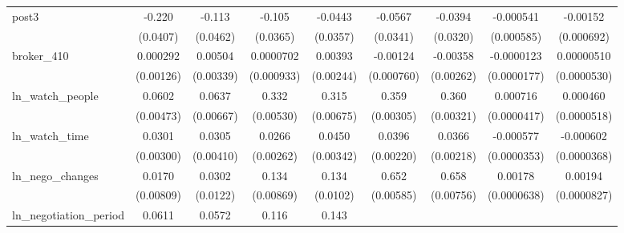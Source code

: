 {\begin{tabular}{l*{8}{c}}
\addlinespace
post3       &      -0.220\sym{***}&      -0.113\sym{**} &      -0.105\sym{***}&     -0.0443         &     -0.0567\sym{*}  &     -0.0394         &   -0.000541         &    -0.00152\sym{**} \\
            &    (0.0407)         &    (0.0462)         &    (0.0365)         &    (0.0357)         &    (0.0341)         &    (0.0320)         &  (0.000585)         &  (0.000692)         \\
\addlinespace
broker\_410  &    0.000292         &     0.00504         &   0.0000702         &     0.00393         &    -0.00124         &    -0.00358         &  -0.0000123         &  0.00000510         \\
            &   (0.00126)         &   (0.00339)         &  (0.000933)         &   (0.00244)         &  (0.000760)         &   (0.00262)         & (0.0000177)         & (0.0000530)         \\
\addlinespace
ln\_watch\_people&      0.0602\sym{***}&      0.0637\sym{***}&       0.332\sym{***}&       0.315\sym{***}&       0.359\sym{***}&       0.360\sym{***}&    0.000716\sym{***}&    0.000460\sym{***}\\
            &   (0.00473)         &   (0.00667)         &   (0.00530)         &   (0.00675)         &   (0.00305)         &   (0.00321)         & (0.0000417)         & (0.0000518)         \\
\addlinespace
ln\_watch\_time&      0.0301\sym{***}&      0.0305\sym{***}&      0.0266\sym{***}&      0.0450\sym{***}&      0.0396\sym{***}&      0.0366\sym{***}&   -0.000577\sym{***}&   -0.000602\sym{***}\\
            &   (0.00300)         &   (0.00410)         &   (0.00262)         &   (0.00342)         &   (0.00220)         &   (0.00218)         & (0.0000353)         & (0.0000368)         \\
\addlinespace
ln\_nego\_changes&      0.0170\sym{**} &      0.0302\sym{**} &       0.134\sym{***}&       0.134\sym{***}&       0.652\sym{***}&       0.658\sym{***}&     0.00178\sym{***}&     0.00194\sym{***}\\
            &   (0.00809)         &    (0.0122)         &   (0.00869)         &    (0.0102)         &   (0.00585)         &   (0.00756)         & (0.0000638)         & (0.0000827)         \\
\addlinespace
ln\_negotiation\_period&      0.0611\sym{***}&      0.0572\sym{***}&       0.116\sym{***}&       0.143\sym{***}&                     &                     &                     &                     \\

\end{tabular}}
